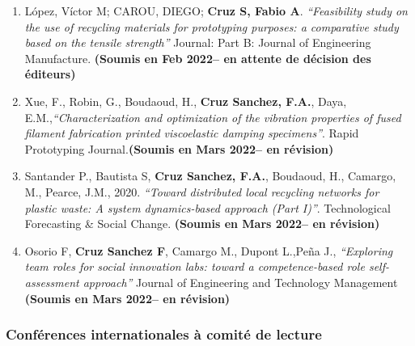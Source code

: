 \documentclass[
  11pt,
]{article}
\begin{document}
\begin{enumerate}
\def\labelenumi{\arabic{enumi}.}
\item
  López, Víctor M; CAROU, DIEGO; \textbf{Cruz S, Fabio A}.
  \emph{``Feasibility study on the use of recycling materials for
  prototyping purposes: a comparative study based on the tensile
  strength''} Journal: Part B: Journal of Engineering Manufacture.
  \textbf{(Soumis en Feb 2022-- en attente de décision des éditeurs)}
\item
  Xue, F., Robin, G., Boudaoud, H., \textbf{Cruz Sanchez, F.A.}, Daya,
  E.M.,\emph{``Characterization and optimization of the vibration
  properties of fused filament fabrication printed viscoelastic damping
  specimens''}. Rapid Prototyping Journal.\textbf{(Soumis en Mars 2022--
  en révision)}
\item
  Santander P., Bautista S, \textbf{Cruz Sanchez, F.A.}, Boudaoud, H.,
  Camargo, M., Pearce, J.M., 2020. \emph{``Toward distributed local
  recycling networks for plastic waste: A system dynamics-based approach
  (Part I)''}. Technological Forecasting \& Social Change.
  \textbf{(Soumis en Mars 2022-- en révision)}
\item
  Osorio F, \textbf{Cruz Sanchez F}, Camargo M., Dupont L.,Peña J.,
  \emph{``Exploring team roles for social innovation labs: toward a
  competence-based role self-assessment approach''} Journal of
  Engineering and Technology Management \textbf{(Soumis en Mars 2022--
  en révision)}
\end{enumerate}

\hypertarget{confuxe9rences-internationales-uxe0-comituxe9-de-lecture}{%
\subsubsection{Conférences internationales à comité de
lecture}\label{confuxe9rences-internationales-uxe0-comituxe9-de-lecture}}
\end{document}
